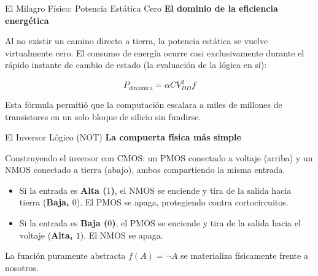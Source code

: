\documentclass[10pt, aspectratio=169]{beamer}
\begin{document}
\begin{frame}{El Milagro Físico: Potencia Estática Cero}
    \vspace{0.4cm}
    \Large \textbf{El dominio de la eficiencia energética}
    
    \vspace{0.6cm}
    \normalsize
    Al no existir un camino directo a tierra, la potencia estática se vuelve virtualmente cero. El consumo de energía ocurre casi exclusivamente durante el rápido instante de cambio de estado (la evaluación de la lógica en sí):
    
    $$P_{\text{dinámica}}=\alpha C V_{DD}^2 f$$
    
    \vspace{0.4cm}
    Esta fórmula permitió que la computación escalara a miles de millones de transistores en un solo bloque de silicio sin fundirse.
\end{frame}


\begin{frame}{El Inversor Lógico (NOT)}
    \vspace{0.4cm}
    \Large \textbf{La compuerta física más simple}
    
    \vspace{0.4cm}
    \normalsize
    Construyendo el inversor con CMOS: un PMOS conectado a voltaje (arriba) y un NMOS conectado a tierra (abajo), ambos compartiendo la misma entrada.
    
    \begin{itemize}
        \setlength\itemsep{0.3cm}
        \item Si la entrada es \textbf{Alta ($1$)}, el NMOS se enciende y tira de la salida hacia tierra (\textbf{Baja, $0$}). El PMOS se apaga, protegiendo contra cortocircuitos.
        \item Si la entrada es \textbf{Baja ($0$)}, el PMOS se enciende y tira de la salida hacia el voltaje (\textbf{Alta, $1$}). El NMOS se apaga.
    \end{itemize}
    
    \vspace{0.2cm}
    La función puramente abstracta $f(A)=\neg A$ se materializa físicamente frente a nosotros.
\end{frame}
\end{document}
